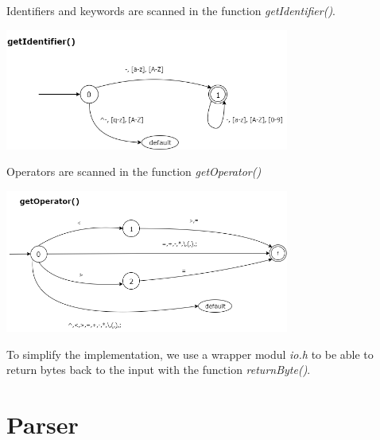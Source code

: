 \documentclass[12pt,a4paper,titlepage]{article}
\begin{document}
\begin{justify}
Identifiers and keywords are scanned in the function \textit{getIdentifier()}.
\end{justify}
\begin{center}
  \includegraphics[width=0.7\textwidth]{img/getIdentifier.png}
\end{center}

\begin{justify}
Operators are scanned in the function \textit{getOperator()}
\end{justify}
\begin{center}
  \includegraphics[width=0.7\textwidth]{img/getOperator.png}
\end{center}

\begin{justify}
To simplify the implementation, we use a wrapper modul \textit{io.h} to
be able to return bytes back to the input with the function \textit{returnByte()}.
\end{justify}

\newpage

\section{Parser}
\end{document}
